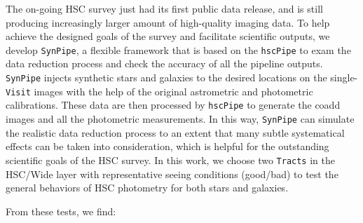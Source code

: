 \documentclass[useamsfonts]{pasj01}
\def\hscpipe{\texttt{hscPipe}}
\def\synpipe{\texttt{SynPipe}}
\def\visit{\texttt{Visit}}
\def\tracts{\texttt{Tracts}}
\begin{document}
    The on-going HSC survey just had its first public data release, and is still 
    producing increasingly larger amount of high-quality imaging data. 
    To help achieve the designed goals of the survey and facilitate scientific 
    outputs, we develop \synpipe{}, a flexible framework that is based on the 
    \hscpipe{} to exam the data reduction process and check the accuracy of all the
    pipeline outputs.
    \synpipe{} injects synthetic stars and galaxies to the desired locations on the
    single-\visit{} images with the help of the original astrometric and 
    photometric calibrations.
    These data are then processed by \hscpipe{} to generate the coadd images and 
    all the photometric measurements. 
    In this way, \synpipe{} can simulate the realistic data reduction process
    to an extent that many subtle systematical effects can be taken into 
    consideration, which is helpful for the outstanding scientific goals of the HSC 
    survey. 
    In this work, we choose two \tracts{} in the HSC/Wide layer with 
    representative seeing conditions (good/bad) to test the general behaviors of HSC 
    photometry for both stars and galaxies.
    
    From these tests, we find:  
\end{document}
